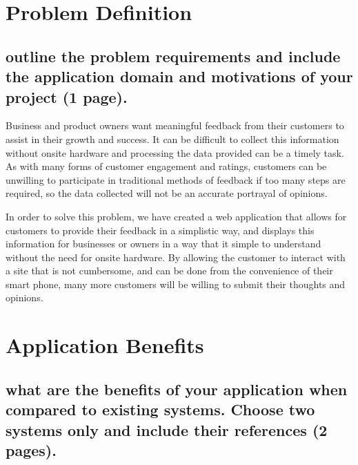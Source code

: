 \documentclass[letterpaper, 12 pt, conference]{ieeeconf}
\begin{document}
\thispagestyle{empty}
\pagestyle{empty}






\doublespacing 
\onecolumn

\section{Problem Definition}
\subsection{outline the problem requirements and include the application domain and motivations of your project (1 page).}

Business and product owners want meaningful feedback from their customers to assist in their growth and success. It can be difficult to collect this information without onsite hardware and processing the data provided can be a timely task. As with many forms of customer engagement and ratings, customers can be unwilling to participate in traditional methods of feedback if too many steps are required, so the data collected will not be an accurate portrayal of opinions.

In order to solve this problem, we have created a web application that allows for customers to provide their feedback in a simplistic way, and displays this information for businesses or owners in a way that it simple to understand without the need for onsite hardware. By allowing the customer to interact with a site that is not cumbersome, and can be done from the convenience of their smart phone, many more customers will be willing to submit their thoughts and opinions.










\newpage    
\section{Application Benefits}
\subsection{what are the benefits of your application when compared to existing systems. Choose two systems only and include their references (2 pages).}
\end{document}
